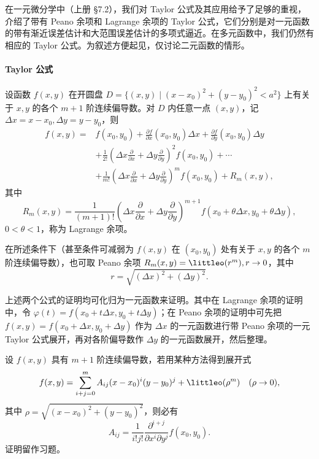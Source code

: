 在一元微分学中（上册 §7.2），我们对 Taylor 公式及其应用给予了足够的重视，介绍了带有 Peano 余项和 Lagrange 余项的 Taylor 公式，它们分别是对一元函数的带有渐近误差估计和大范围误差估计的多项式逼近。在多元函数中，我们仍然有相应的 Taylor 公式。为叙述方便起见，仅讨论二元函数的情形。

\paragraph{Taylor 公式}
设函数 $f(x,y)$ 在开圆盘 $D=\{(x,y)\mid (x-x_0)^2+(y-y_0)^2<a^2\}$ 上有关于 $x,y$ 的各个 $m+1$ 阶连续偏导数。对 $D$ 内任意一点 $(x,y)$，记 $\Delta x=x-x_0,\Delta y=y-y_0$，则
\[
\begin{aligned}
  f(x,y)={}&f(x_0,y_0)+\frac{\partial f}{\partial x}(x_0,y_0)\Delta x
  +\frac{\partial f}{\partial y}(x_0,y_0)\Delta y\\
  &+\frac1{2!}\left(\Delta x\frac{\partial}{\partial x}+\Delta y\frac{\partial}{\partial y}\right)^2 f(x_0,y_0)+\cdots\\
  &+\frac1{m!}\left(\Delta x\frac{\partial}{\partial x}+\Delta y\frac{\partial}{\partial y}\right)^m f(x_0,y_0)+R_m(x,y),
\end{aligned}
\]
其中
\[
  R_m(x,y)=\frac1{(m+1)!}
  \left(\Delta x\frac{\partial}{\partial x}+\Delta y\frac{\partial}{\partial y}\right)^{m+1}
  f(x_0+\theta\Delta x,y_0+\theta\Delta y),
\]
$0<\theta<1$，称为 Lagrange 余项。

在所述条件下（甚至条件可减弱为 $f(x,y)$ 在 $(x_0,y_0)$ 处有关于 $x,y$ 的各个 $m$ 阶连续偏导数），也可取 Peano 余项 $R_m(x,y)=\littleo(r^m),r\to0$，其中
\[
  r=\sqrt{(\Delta x)^2+(\Delta y)^2}.
\]

上述两个公式的证明均可化归为一元函数来证明。其中在 Lagrange 余项的证明中，令 $\varphi(t)=f(x_0+t\Delta x,y_0+t\Delta y)$；在 Peano 余项的证明中可先把 $f(x,y)=f(x_0+\Delta x,y_0+\Delta y)$ 作为 $\Delta x$ 的一元函数进行带 Peano 余项的一元 Taylor 公式展开，再对各阶偏导数作 $\Delta y$ 的一元函数展开，然后整理。

\begin{xproposition}
设 $f(x,y)$ 具有 $m+1$ 阶连续偏导数，若用某种方法得到展开式
\[
  f(x,y)=\sum_{i+j=0}^{m}A_{ij}(x-x_0)^i(y-y_0)^j+\littleo(\rho^m)\quad(\rho\to0),
\]
其中 $\rho=\sqrt{(x-x_0)^2+(y-y_0)^2}$，则必有
\[
  A_{ij}=\frac1{i!j!}\frac{\partial^{i+j}}{\partial x^i\partial y^j}f(x_0,y_0).
\]
证明留作习题。
\end{xproposition}

